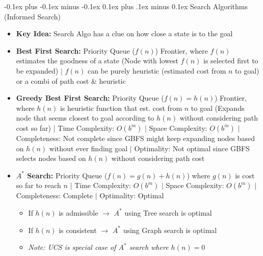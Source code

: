 \documentclass[landscape]{article}
\makeatletter
\renewcommand{\subsection}{\@startsection{subsection}{2}{0mm}%
  {-0.1ex plus -0.1ex minus -0.1ex}%
  {0.1ex plus .1ex minus 0.1ex}%
{\normalfont\scriptsize\bfseries}}
\makeatother
\begin{document}
\begin{multicols*}{5}
    \subsection{Search Algorithms (Informed Search)}
    \begin{itemize}
      \item \textbf{Key Idea:} Search Algo has a clue on how close a state is to the goal
      \item \textbf{Best First Search:} Priority Queue ($f(n)$) Frontier, where $f(n)$ estimates the goodness of a state (Node with lowest $f(n)$ is selected first to be expanded) $\vert$ $f(n)$ can be purely heuristic (estimated cost from $n$ to goal) or a combi of path cost \& heuristic
      \item \textbf{Greedy Best First Search:} Priority Queue ($f(n) = h(n)$) Frontier, where $h(n)$ is heuristic function that est. cost from $n$ to goal (Expands node that seems closest to goal according to $h(n)$ without considering path cost so far) $\vert$ Time Complexity: $O(b^m)$ $\vert$  Space Complexity: $O(b^m)$ $\vert$ Completeness: Not complete since GBFS might keep expanding nodes based on $h(n)$ without ever finding goal $\vert$  Optimality: Not optimal since GBFS selects nodes based on $h(n)$ without considering path cost
      \item \textbf{$A^*$ Search:} Priority Queue ($f(n) = g(n) + h(n)$) where $g(n)$ is cost so far to reach $n$ $\vert$ Time Complexity: $O(b^m)$ $\vert$ Space Complexity: $O(b^m)$ $\vert$  Completeness: Complete $\vert$ Optimality: Optimal
      \begin{itemize}
        \item If $h(n)$ is admissible $\rightarrow$ $A^*$ using Tree search is optimal
        \item If $h(n)$ is consistent $\rightarrow$ $A^*$ using Graph search is optimal
        \item \textit{Note: UCS is special case of $A^*$ search where $h(n) = 0$}
      \end{itemize}


\end{itemize}
\end{multicols*}
\end{document}
